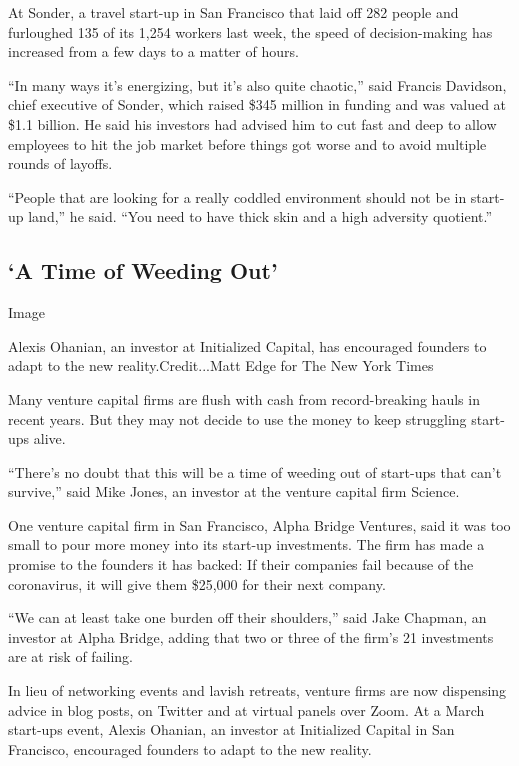 At Sonder, a travel start-up in San Francisco that laid off 282 people
and furloughed 135 of its 1,254 workers last week, the speed of
decision-making has increased from a few days to a matter of hours.

``In many ways it's energizing, but it's also quite chaotic,'' said
Francis Davidson, chief executive of Sonder, which raised \$345 million
in funding and was valued at \$1.1 billion. He said his investors had
advised him to cut fast and deep to allow employees to hit the job
market before things got worse and to avoid multiple rounds of layoffs.

``People that are looking for a really coddled environment should not be
in start-up land,'' he said. ``You need to have thick skin and a high
adversity quotient.''

\hypertarget{a-time-of-weeding-out}{%
\subsection{`A Time of Weeding Out'}\label{a-time-of-weeding-out}}

Image

Alexis Ohanian, an investor at Initialized Capital, has encouraged
founders to adapt to the new reality.Credit...Matt Edge for The New York
Times

Many venture capital firms are flush with cash from record-breaking
hauls in recent years. But they may not decide to use the money to keep
struggling start-ups alive.

``There's no doubt that this will be a time of weeding out of start-ups
that can't survive,'' said Mike Jones, an investor at the venture
capital firm Science.

One venture capital firm in San Francisco, Alpha Bridge Ventures, said
it was too small to pour more money into its start-up investments. The
firm has made a promise to the founders it has backed: If their
companies fail because of the coronavirus, it will give them \$25,000
for their next company.

``We can at least take one burden off their shoulders,'' said Jake
Chapman, an investor at Alpha Bridge, adding that two or three of the
firm's 21 investments are at risk of failing.

In lieu of networking events and lavish retreats, venture firms are now
dispensing advice in blog posts, on Twitter and at virtual panels over
Zoom. At a March start-ups event, Alexis Ohanian, an investor at
Initialized Capital in San Francisco, encouraged founders to adapt to
the new reality.

